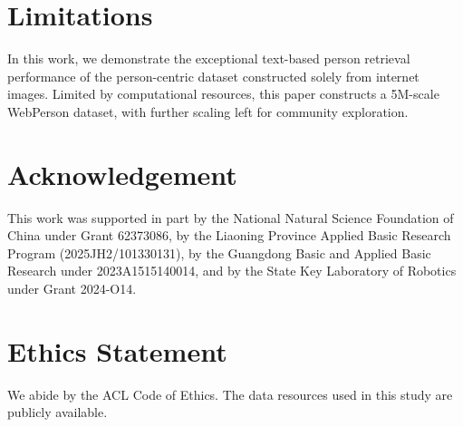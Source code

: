 \section*{Limitations}
In this work, we demonstrate the exceptional text-based person retrieval performance of the person-centric dataset constructed solely from internet images. Limited by computational resources, this paper constructs a 5M-scale WebPerson dataset, with further scaling left for community exploration.


\section*{Acknowledgement}
This work was supported in part by the National Natural Science Foundation of China under Grant 62373086,  by the Liaoning Province Applied Basic Research Program (2025JH2/101330131), by the Guangdong Basic and Applied Basic Research under 2023A1515140014, and by the State Key Laboratory of Robotics under Grant 2024-O14.
\section*{Ethics Statement}
We abide by the ACL Code of Ethics. The data resources used in this study are publicly available.